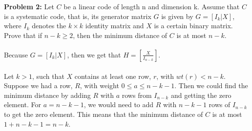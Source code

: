 \documentclass[11pt]{article}
\newenvironment{problem}[1]{\textbf{Problem #1: }}{\newpage}
\begin{document}
	\begin{problem}{2}
		 Let $C$ be a linear code of length n and dimension k. Assume that $C$ is a systematic code, that is, its generator matrix $G$ is given by	$G = [I_k | X]$, where $I_k$ denotes the $k \times k$ identity matrix and $X$ is a certain binary matrix. Prove that if $n - k \geq 2$, then the minimum distance of $C$ is at most $n - k$.
		 \\ \\
		 Because $G = [I_k | X]$, then we get that $H = \left[\frac{X}{I_{n-k}}\right]$.
		 \\ \\
		 Let $k > 1$, such that $X$ contains at least one row, $r$, with $wt(r) < n - k$.  Suppose we had a row, $R$, with weight $0 \leq a \leq n - k - 1$.  Then we could find the minimum distance by adding $R$ with $a$ rows from $I_{n-k}$ and getting the zero element. For $a = n - k -1$, we would need to add $R$ with $n - k - 1$ rows of $I_{n-k}$ to get the zero element.  This means that the minimum distance of $C$ is at most $1 + n - k - 1 = n- k$. 
	\end{problem}
\end{document}
